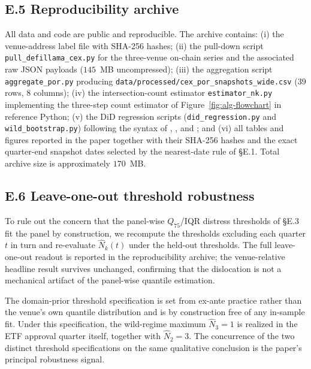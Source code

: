 \documentclass[12pt]{article}
\theoremstyle{sampledef}
\theoremstyle{sampleplain}
\theoremstyle{sampleremark}
\newcommand{\1}{\mathbf{1}}
\begin{document}
\subsection*{E.5 Reproducibility archive}

\sloppy
All data and code are public and reproducible. The archive
contains:
(i) the venue-address label file with SHA-256 hashes;
(ii) the pull-down script \texttt{pull\_defillama\_\allowbreak cex.py} for the
three-venue on-chain series and the associated raw JSON payloads
($145$~MB uncompressed);
(iii) the aggregation script \texttt{aggregate\_\allowbreak por.py} producing
\texttt{data/processed/}\allowbreak\texttt{cex\_por\_snapshots\_wide.csv}
(39 rows, 8 columns);
(iv) the intersection-count estimator \texttt{estimator\_\allowbreak nk.py}
implementing the three-step count estimator of
Figure~\ref{fig:alg-flowchart} in reference Python;
(v) the DiD regression scripts (\texttt{did\_\allowbreak regression.py} and
\texttt{wild\_\allowbreak bootstrap.py}) following the syntax of
\citet{Callaway-SantAnna2021}, \citet{Sun-Abraham2021}, and
\citet{Borusyak2024}; and
(vi) all tables and figures reported in the paper together with
their SHA-256 hashes and the exact quarter-end snapshot dates
selected by the nearest-date rule of \S E.1. Total archive size
is approximately $170$~MB.
\fussy

\subsection*{E.6 Leave-one-out threshold robustness}

To rule out the concern that the panel-wise $Q_{75}$/IQR distress
thresholds of \S E.3 fit the panel by construction, we recompute
the thresholds excluding each quarter $t$ in turn and re-evaluate
$\hat N_k(t)$ under the held-out thresholds. The full leave-one-out
readout is reported in the reproducibility archive; the
venue-relative headline result survives unchanged, confirming that
the dislocation is not a mechanical artifact of the panel-wise
quantile estimation.

The domain-prior threshold specification is set from ex-ante
practice rather than the venue's own quantile distribution and is
by construction free of any in-sample fit. Under this
specification, the wild-regime maximum $\hat N_3 = 1$ is realized
in the ETF approval quarter itself, together with $\hat N_2 = 3$.
The concurrence of the two distinct threshold specifications on
the same qualitative conclusion is the paper's principal
robustness signal.
\end{document}
